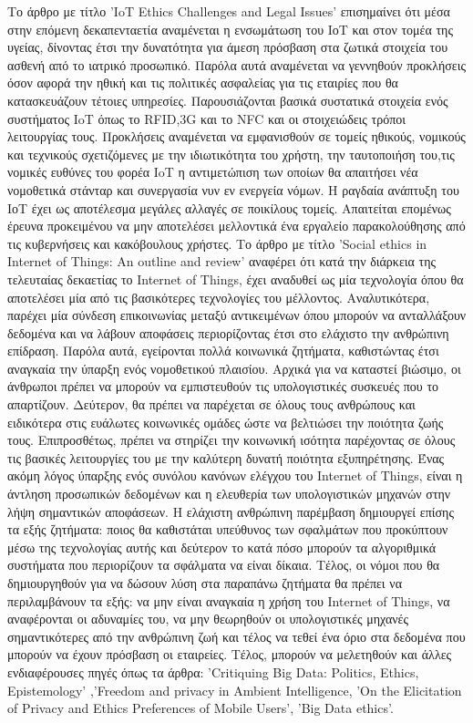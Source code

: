 \documentclass{article}
\begin{document}
Το άρθρο με τίτλο 'IoT Ethics Challenges and Legal Issues' επισημαίνει ότι μέσα στην επόμενη δεκαπενταετία αναμένεται η ενσωμάτωση του ΙοΤ και στον τομέα της υγείας, δίνοντας έτσι την δυνατότητα για άμεση πρόσβαση στα ζωτικά στοιχεία του ασθενή από το ιατρικό προσωπικό. Παρόλα αυτά αναμένεται να γεννηθούν προκλήσεις όσον αφορά την  ηθική και τις πολιτικές ασφαλείας για τις εταιρίες που θα κατασκευάζουν τέτοιες  υπηρεσίες. Παρουσιάζονται βασικά συστατικά στοιχεία ενός συστήματος  IoT όπως το RFID,3G και το NFC και οι στοιχειώδεις τρόποι λειτουργίας τους. Προκλήσεις αναμένεται να εμφανισθούν σε  τομείς ηθικούς, νομικούς και τεχνικούς σχετιζόμενες με την ιδιωτικότητα του χρήστη, την ταυτοποιήση του,τις νομικές ευθύνες του φορέα IoT  η αντιμετώπιση των οποίων θα απαιτήσει νέα νομοθετικά στάνταρ και συνεργασία νυν εν ενεργεία νόμων. Η ραγδαία ανάπτυξη του ΙοΤ έχει ως αποτέλεσμα μεγάλες αλλαγές σε ποικίλους τομείς. Απαιτείται επομένως έρευνα προκειμένου να μην αποτελέσει μελλοντικά ένα εργαλείο παρακολούθησης από τις κυβερνήσεις και κακόβουλους χρήστες.\newline
 Το άρθρο με τίτλο 'Social ethics in Internet of Things: An outline and review' αναφέρει ότι κατά την διάρκεια της τελευταίας δεκαετίας το Internet of Things, έχει αναδυθεί ως μία τεχνολογία όπου θα αποτελέσει μία από τις βασικότερες τεχνολογίες του μέλλοντος. Αναλυτικότερα, παρέχει μία σύνδεση επικοινωνίας μεταξύ αντικειμένων όπου μπορούν να ανταλλάξουν δεδομένα και να λάβουν αποφάσεις περιορίζοντας έτσι στο ελάχιστο την ανθρώπινη επίδραση. Παρόλα αυτά, εγείρονται πολλά κοινωνικά ζητήματα, καθιστώντας έτσι αναγκαία την ύπαρξη ενός νομοθετικού πλαισίου. Αρχικά για να καταστεί βιώσιμο, οι άνθρωποι πρέπει να μπορούν να εμπιστευθούν τις υπολογιστικές συσκευές που το απαρτίζουν. Δεύτερον, θα πρέπει να παρέχεται σε όλους τους ανθρώπους και ειδικότερα στις ευάλωτες κοινωνικές ομάδες ώστε να βελτιώσει την ποιότητα ζωής τους. Επιπροσθέτως, πρέπει να στηρίζει την κοινωνική ισότητα παρέχοντας σε όλους τις βασικές λειτουργίες του με την καλύτερη δυνατή ποιότητα εξυπηρέτησης. Ένας ακόμη λόγος ύπαρξης ενός συνόλου κανόνων ελέγχου του Internet of Things, είναι η άντληση προσωπικών δεδομένων και η ελευθερία των υπολογιστικών μηχανών στην λήψη σημαντικών αποφάσεων. Η ελάχιστη ανθρώπινη παρέμβαση δημιουργεί επίσης τα εξής ζητήματα: ποιος θα καθιστάται υπεύθυνος των σφαλμάτων που προκύπτουν μέσω της τεχνολογίας αυτής και δεύτερον  το κατά πόσο μπορούν τα αλγοριθμικά συστήματα που περιορίζουν τα σφάλματα να είναι δίκαια. Τέλος, οι νόμοι που θα δημιουργηθούν για να δώσουν λύση στα παραπάνω ζητήματα θα πρέπει να περιλαμβάνουν τα εξής: να μην είναι αναγκαία η χρήση του Internet of Things, να αναφέρονται οι αδυναμίες του, να μην θεωρηθούν οι υπολογιστικές μηχανές σημαντικότερες από την ανθρώπινη ζωή και τέλος να τεθεί ένα όριο στα δεδομένα που μπορούν να έχουν πρόσβαση οι εταιρείες.\newline
Τέλος,
μπορούν να μελετηθούν και άλλες ενδιαφέρουσες πηγές όπως τα άρθρα:
'Critiquing Big Data: Politics, Ethics, Epistemology' ,'Freedom and privacy in Ambient Intelligence, 'On the Elicitation of Privacy and Ethics Preferences
of Mobile Users', 'Big Data ethics'.
\end{document}
